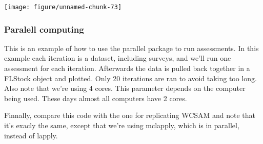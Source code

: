 \documentclass[a4paper,english,10pt]{article}\usepackage[]{graphicx}\usepackage[]{color}
\newenvironment{knitrout}{}{} %
\begin{document}
\begin{knitrout}
\color{fgcolor}

{\centering \texttt{[image: figure/unnamed-chunk-73]} 

}



\end{knitrout}


\subsubsection{Paralell computing}

This is an example of how to use the parallel package to run assessments. In this example each iteration is a dataset, including surveys, and we'll run one assessment for each iteration. Afterwards the data is pulled back together in a FLStock object and plotted. Only 20 iterations are ran to avoid taking too long. Also note that we're using 4 cores. This parameter depends on the computer being used. These days almost all computers have 2 cores.

Finnally, compare this code with the one for replicating WCSAM and note that it's exacly the same, except that we're using mclapply, which is in parallel, instead of lapply. 
\end{document}
